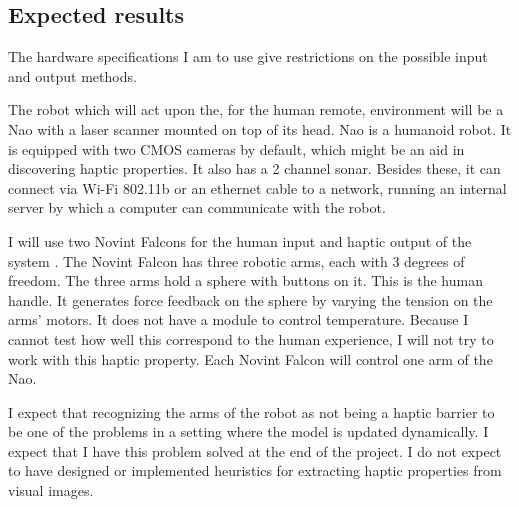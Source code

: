 \documentclass[10pt, a4paper]{article}
\begin{document}
\begin{multicols}{2}
\section{Expected results}

The hardware specifications I am to use give restrictions on the possible
input and output methods.

The robot which will act upon the, for the human remote, environment will be a
Nao \cite{NaoSpec} with a laser scanner mounted on top of its head.  
Nao is a humanoid robot. It is equipped with two CMOS cameras by default,
which might be an aid in discovering haptic properties.   It also has a 2 
channel sonar.  Besides these, it can connect via Wi-Fi 802.11b or an 
ethernet cable to a network, running an internal server by which a computer 
can communicate with the robot.  

I will use two Novint Falcons for the human input and haptic output of the
system \cite{NovintFalconSpec}.  The Novint Falcon has three robotic arms, each
with 3 degrees of freedom. The three arms hold a sphere with buttons on it.
This is the human handle.  It generates force feedback on the sphere by
varying the tension on the arms' motors.  It does not have a module
to control temperature.  Because I cannot test how well this correspond to the
human experience, I will not try to work with this haptic property.  Each
Novint Falcon will control one arm of the Nao.  

I expect that recognizing the arms of the robot as not being a haptic barrier
to be one of the problems in a setting where the model is updated dynamically.
I expect that I have this problem solved at the end of the project.  I do not
expect to have designed or implemented heuristics for extracting haptic
properties from visual images.


\end{multicols}
\end{document}
